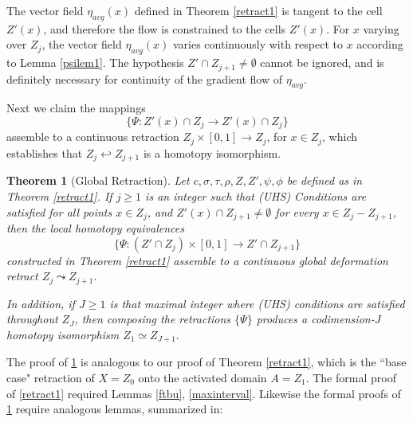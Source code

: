 \documentclass[12pt]{amsart}
\newtheorem{thm}{Theorem}
\newtheorem{lem}{Lemma}
\theoremstyle{definition}
\theoremstyle{remark}
\newcommand{\del}{\partial}
\newcommand{\cd}{c_\Delta}
\begin{document}
The vector field $\eta_{avg}(x)$ defined in Theorem \ref{retract1} is tangent to the cell $Z'(x)$, and therefore the flow is constrained to the cells $Z'(x)$. For $x$ varying over $Z_j$, the vector field $\eta_{avg}(x)$ varies continuously with respect to $x$ according to Lemma \ref{psilem1}. The hypothesis $Z' \cap Z_{j+1} \neq \emptyset$ cannot be ignored, and is definitely necessary for continuity of the gradient flow of $\eta_{avg}$. 




Next we claim the mappings $$\{\Psi: Z'(x)\cap Z_j \to Z'(x) \cap Z_j\}$$ assemble to a continuous retraction $Z_j \times [0,1] \to Z_j$, for $x\in Z_j$, which establishes that $Z_j \hookleftarrow Z_{j+1}$ is a homotopy isomorphism.

\begin{thm}[Global Retraction]
Let $c, \sigma, \tau, \rho, Z, Z', \psi, \phi$ be defined as in Theorem \ref{retract1}. If $j\geq 1$ is an integer such that (UHS) Conditions are satisfied for all points $x \in Z_j$, and $Z'(x) \cap Z_{j+1} \neq \emptyset$ for every $x\in Z_j-Z_{j+1}$, then the local homotopy equivalences $$\{\Psi: (Z'\cap Z_j) \times [0,1] \to Z'\cap Z_{j+1}\}$$ constructed in Theorem \ref{retract1} assemble to a continuous global deformation retract $Z_j \leadsto Z_{j+1}.$ 

In addition, if $J\geq 1$ is that maximal integer where (UHS) conditions are satisfied throughout $Z_J$, then composing the retractions $\{\Psi\}$ produces a codimension-$J$ homotopy isomorphism $Z_1 \simeq Z_{J+1}.$ 
\label{retract2}
\end{thm}
The proof of \ref{retract2} is analogous to our proof of Theorem \ref{retract1}, which is the ``base case" retraction of $X=Z_0$ onto the activated domain $A=Z_1$. The formal proof of \ref{retract1} required Lemmas \ref{ftbu}, \ref{maxinterval}. Likewise the formal proofs of \ref{retract2} require analogous lemmas, summarized in:
\end{document}
